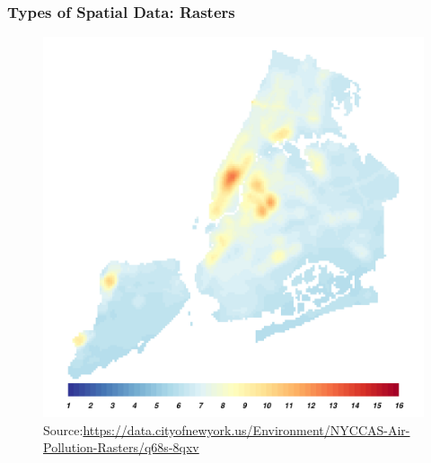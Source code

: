 \documentclass[
  shownotes,
  xcolor={svgnames},
  hyperref={colorlinks,citecolor=DarkBlue,linkcolor=DarkRed,urlcolor=DarkBlue}
   , aspectratio=169]{beamer}
\begin{document}
\begin{frame}[fragile]
\frametitle{Types of Spatial Data: Rasters}


\begin{figure}[H] \centering
  \centering
\includegraphics[scale=0.40]{figures/NewYork.pdf}
  \\
  \tiny Source:\url{https://data.cityofnewyork.us/Environment/NYCCAS-Air-Pollution-Rasters/q68s-8qxv}
\end{figure}



\end{frame}


\end{document}
